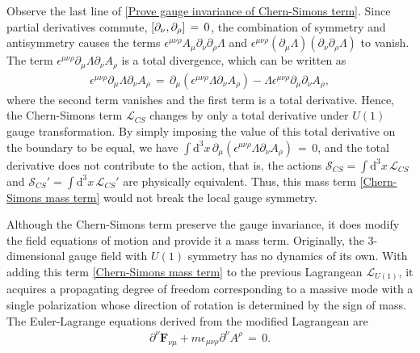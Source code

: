 Observe the last line of \eqref{Prove gauge invariance of Chern-Simons term}. Since partial derivatives commute, $\comm{\partial_{\nu}}{\partial_{\rho}}\,=\,0$, the combination of symmetry and antisymmetry causes the terms $\epsilon^{\mu\nu\rho}A_{\mu}\partial_{\nu}\partial_{\rho}\Lambda$ and $\epsilon^{\mu\nu\rho}\left(\partial_{\mu}\Lambda\right)\left(\partial_{\nu}\partial_{\rho}\Lambda\right)$ to vanish. The term $\epsilon^{\mu\nu\rho}\partial_{\mu}\Lambda\partial_{\nu}A_{\rho}$ is a total divergence, which can be written as 
\begin{equation}
    \begin{split}
    \epsilon^{\mu\nu\rho}\partial_{\mu}\Lambda\partial_{\nu}A_{\rho}\,=\,\partial_{\mu}\left(\epsilon^{\mu\nu\rho}\Lambda\partial_{\nu}A_{\rho}\right)-\Lambda\epsilon^{\mu\nu\rho}\partial_{\mu}\partial_{\nu}A_{\rho},
    \end{split}
\end{equation}
where the second term vanishes and the first term is a total derivative. Hence, the Chern-Simons term $\mathcal{L}_{CS}$ changes by only a total derivative under $U\left(1\right)$ gauge transformation. By simply imposing the value of this total derivative on the boundary to be equal, we have $\int\!\mathrm{d}^{3}x\,\partial_{\mu}\left(\epsilon^{\mu\nu\rho}\Lambda\partial_{\nu}A_{\rho}\right)\,=\,0$, and the total derivative does not contribute to the action, that is, the actions $\mathcal{S}_{CS}=\int\!\mathrm{d}^{3}x\,\mathcal{L}_{CS}$ and $\mathcal{S}_{CS}'=\int\!\mathrm{d}^{3}x\,\mathcal{L}_{CS}'$ are physically equivalent. Thus, this mass term \eqref{Chern-Simons mass term} would not break the local gauge symmetry. 
\par Although the Chern-Simons term preserve the gauge invariance, it does modify the field equations of motion and provide it a mass term. Originally, the 3-dimensional gauge field with $U\left(1\right)$ symmetry has no dynamics of its own. With adding this term \eqref{Chern-Simons mass term} to the previous Lagrangean $\mathcal{L}_{U\left(1\right)}$, it acquires a propagating degree of freedom corresponding to a massive mode with a single polarization whose direction of rotation is determined by the sign of mass. The Euler-Lagrange equations derived from the modified Lagrangean are
\begin{equation}\label{C-S term field equations without gauge fixing}
    \begin{split}
        \partial^{\nu}\mathbf{F}_{\nu\mu}+m\epsilon_{\mu\nu\rho}\partial^{\nu}A^{\rho}\,=\,0.
    \end{split}
\end{equation}
